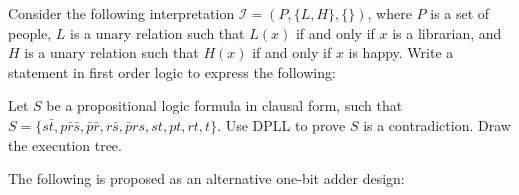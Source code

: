 \documentclass[addpoints]{exam}
\theoremstyle{definition}
\newcommand{\tf}[1][{}]{%
\fillin[#1][0.25in]%
}
\begin{document}
\begin{questions}
\vspace{5mm}



\question[4] Consider the following interpretation $\mathcal{I} = (P,\{L,H\},\{\})$,
where $P$ is a set of people, $L$ is a unary relation such that $L(x)$ if and
only if $x$ is a librarian, and $H$ is a unary relation such that $H(x)$ if
and only if $x$ is happy. Write a statement in first order logic to express
the following:


\question[6] Let $S$ be a propositional logic formula in clausal form, such that
$S = \{s\bar{t}, p\bar{r}\bar{s}, \bar{p}\bar{r}, r\bar{s}, \bar{p}rs, st, pt,
  rt, t\}$. Use DPLL to prove $S$ is a contradiction. Draw the execution tree.

\vspace{60mm}


\question The following is proposed as an alternative one-bit adder design:


\end{questions}
\end{document}
